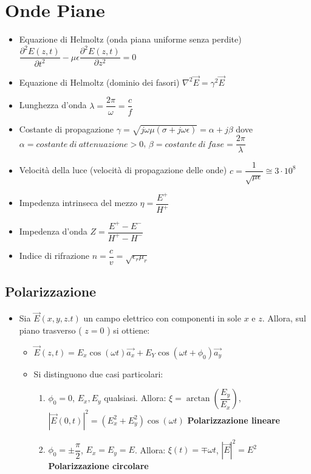 \documentclass{article}
\begin{document}
\section{Onde Piane}
\begin{itemize}
	\item Equazione di Helmoltz (onda piana uniforme senza perdite) \( \dfrac{\partial^2 E(z, t)}{\partial t^2} - \mu \epsilon \dfrac{\partial^2 E(z, t)}{\partial z^2} = 0\)
	\item Equazione di Helmoltz (dominio dei fasori) \( \nabla^2 \vec{E} = \gamma^2 \vec{E} \)
	\item Lunghezza d'onda \( \lambda = \dfrac{2 \pi}{\omega} = \dfrac{c}{f} \)	
	\item Costante di propagazione \( \gamma = \sqrt{j\omega\mu (\sigma + j \omega \epsilon) } = \alpha + j \beta \) dove \( \alpha = costante\ di\ attenuazione > 0\), \newline \( \beta = costante\ di\ fase = \dfrac{2 \pi}{\lambda} \)
	\item Velocità della luce (velocità di propagazione delle onde) \( c = \dfrac{1}{\sqrt{\mu \epsilon}} \cong 3 \cdot 10^8 \)
	\item Impedenza intrinseca del mezzo \( \eta = \dfrac{E^+}{H^+} \)
	\item Impedenza d'onda \( Z = \dfrac{E^+ - E^-}{H^+ - H^-} \)
	\item Indice di rifrazione \( n = \dfrac{c}{v} = \sqrt{\epsilon_r \mu_r} \)
\end{itemize}

\subsection{Polarizzazione}
\begin{itemize}
	\item Sia \( \vec{E}(x, y, z. t) \) un campo elettrico con componenti in sole \( x \) e \( z \). Allora, sul piano trasverso ( \( z = 0 \) ) si ottiene:
	\begin{itemize}
		\item \( \vec{E}(z, t) = E_x \cos ( \omega t) \vec{a_x} + E_Y \cos( \omega t + \phi_0) \vec{a_y}  \)
		\item Si distinguono due casi particolari:
		\begin{enumerate}
			\item \( \phi_0 = 0 \), \( E_x, E_y \) qualsiasi. Allora: \( \xi  = \arctan\left(\dfrac{E_y}{E_x}\right) \), \( |\vec{E}(0, t)|^2 = (E_x^2 + E_y^2) \cos(\omega t) \) \textbf{Polarizzazione lineare}
			\item  \( \phi_0 = \pm \dfrac{\pi}{2} \), \( E_x = E_y = E \). Allora: \( \xi(t)  = \mp \omega t \), \( |\vec{E}|^2 = E^2 \) \textbf{Polarizzazione circolare}
		\end{enumerate}
	\end{itemize}	  
\end{itemize}
\end{document}

